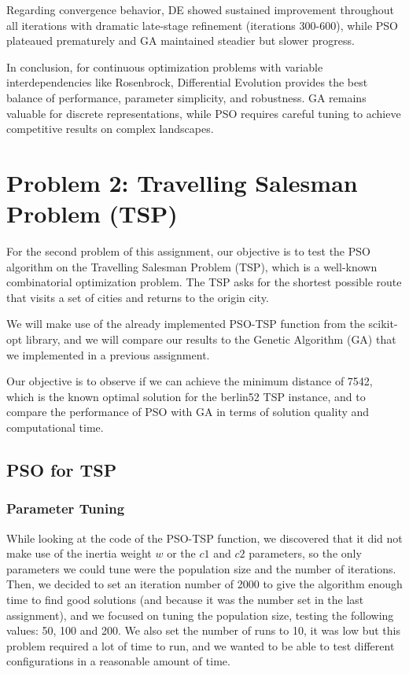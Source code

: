 \documentclass[12pt,a4paper]{article}
\begin{document}
Regarding convergence behavior, DE showed sustained improvement throughout all iterations with dramatic late-stage refinement (iterations 300-600), while PSO plateaued prematurely and GA maintained steadier but slower progress. 

In conclusion, for continuous optimization problems with variable interdependencies like Rosenbrock, Differential Evolution provides the best balance of performance, parameter simplicity, and robustness. GA remains valuable for discrete representations, while PSO requires careful tuning to achieve competitive results on complex landscapes.

\section{Problem 2: Travelling Salesman Problem (TSP)}
For the second problem of this assignment, our objective is to test the PSO algorithm on the Travelling Salesman Problem (TSP), which is a well-known combinatorial optimization problem. The TSP asks for the shortest possible route that visits a set of cities and returns to the origin city.

We will make use of the already implemented PSO-TSP function from the scikit-opt library, 
and we will compare our results to the Genetic Algorithm (GA) that we implemented in a previous assignment.

Our objective is to observe if we can achieve the minimum distance of 7542, which is the known optimal solution for the berlin52 TSP instance, and to compare the performance of PSO with GA in terms of solution quality and computational time.

\subsection{PSO for TSP}
\subsubsection{Parameter Tuning}
While looking at the code of the PSO-TSP function, we discovered that it did not make use of the inertia weight $w$ or the $c1$ and $c2$ parameters, so the only parameters we could tune were the population size and the number of iterations.
Then, we decided to set an iteration number of 2000 to give the algorithm enough time to find good solutions (and because it was the number set in the last assignment), and we focused on tuning the population size, testing the following values: 50, 100 and 200.
We also set the number of runs to 10, it was low but this problem required a lot of time to run, and we wanted to be able to test different configurations in a reasonable amount of time.
\end{document}
